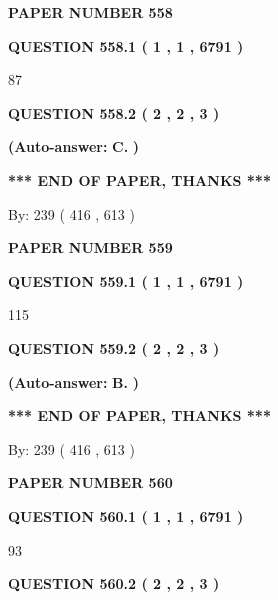 \documentclass{ctexart}
\begin{document}
   
\newpage 
\setcounter{page}{ 
   558001 } 
   
   
 {\textbf{ \Large{ PAPER NUMBER  558  }}}
   
   
   
   
  
  
{\textbf{\large{QUESTION
558.1 
 ( 1 , 1 , 6791 )
}}}

87
  
  
{\textbf{\large{QUESTION
558.2 
 ( 2 , 2 , 3 )
}}}
 
 
{\textbf{(Auto-answer:}}
{\textbf{\large{
C.}}}
{\textbf{)}}
 
 
   
   
   
   
\vspace{1.0in} 
{\textbf{\large{ *** END OF PAPER, THANKS *** }}} 
   
   
\hspace{1.0in} By: 
 239 ( 416 ,  613 )
   
   
   
   
\newpage 
\setcounter{page}{ 
   559001 } 
   
   
 {\textbf{ \Large{ PAPER NUMBER  559  }}}
   
   
   
   
  
  
{\textbf{\large{QUESTION
559.1 
 ( 1 , 1 , 6791 )
}}}

115
  
  
{\textbf{\large{QUESTION
559.2 
 ( 2 , 2 , 3 )
}}}
 
 
{\textbf{(Auto-answer:}}
{\textbf{\large{
B.}}}
{\textbf{)}}
 
 
   
   
   
   
\vspace{1.0in} 
{\textbf{\large{ *** END OF PAPER, THANKS *** }}} 
   
   
\hspace{1.0in} By: 
 239 ( 416 ,  613 )
   
   
   
   
\newpage 
\setcounter{page}{ 
   560001 } 
   
   
 {\textbf{ \Large{ PAPER NUMBER  560  }}}
   
   
   
   
  
  
{\textbf{\large{QUESTION
560.1 
 ( 1 , 1 , 6791 )
}}}

93
  
  
{\textbf{\large{QUESTION
560.2 
 ( 2 , 2 , 3 )
}}}
 
\end{document}
